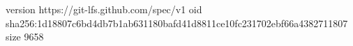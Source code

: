 version https://git-lfs.github.com/spec/v1
oid sha256:1d18807c6bd4db7b1ab631180bafd41d8811ce10fc231702ebf66a4382711807
size 9658
